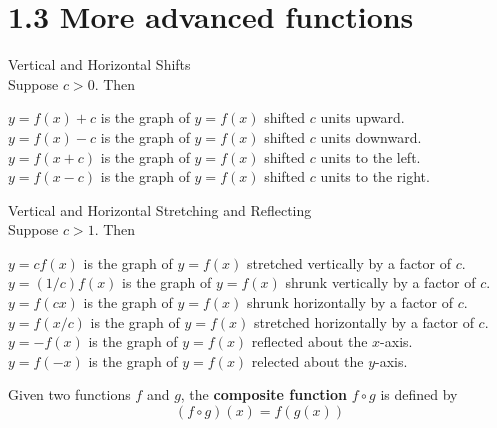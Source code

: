 %
%

\section*{1.3 More advanced functions}

Vertical and Horizontal Shifts\\

Suppose \(c>0\). Then
\begin{center}
\(y=f(x)+c\) is the graph of \(y=f(x)\) shifted \(c\) units upward.\\
\(y=f(x)-c\) is the graph of \(y=f(x)\) shifted \(c\) units downward.\\
\(y=f(x+c)\) is the graph of \(y=f(x)\) shifted \(c\) units to the left.\\
\(y=f(x-c)\) is the graph of \(y=f(x)\) shifted \(c\) units to the right.\\
\end{center}
Vertical and Horizontal Stretching and Reflecting\\

Suppose \(c>1\). Then
\begin{center}
\(y=cf(x)\) is the graph of \(y=f(x)\) stretched vertically by a factor of \(c\).\\
\(y=(1/c)f(x)\) is the graph of \(y=f(x)\) shrunk vertically by a factor of \(c\).\\
\(y=f(cx)\) is the graph of \(y=f(x)\) shrunk horizontally by a factor of \(c\).\\
\(y=f(x/c)\) is the graph of \(y=f(x)\) stretched horizontally by a factor of \(c\).\\
\(y=-f(x)\) is the graph of \(y=f(x)\) reflected about the \(x\)-axis.\\
\(y=f(-x)\) is the graph of \(y=f(x)\) relected about the \(y\)-axis.
\end{center}

Given two functions \(f\) and \(g\), the \textbf{composite function} \(f \circ g\) is defined by 
$$(f \circ g)(x)=f(g(x))$$
